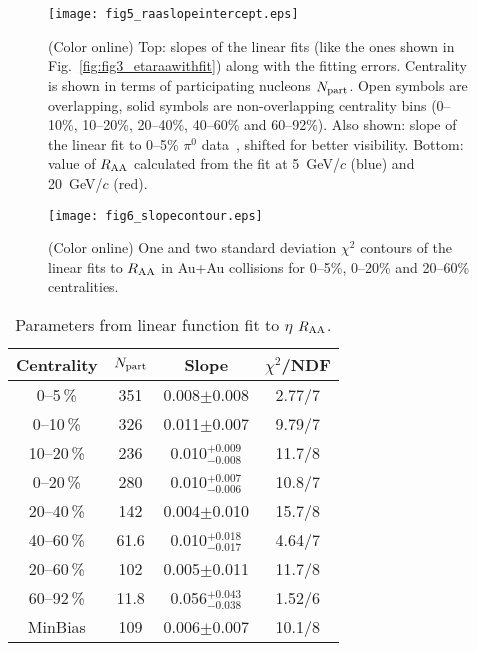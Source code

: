 \documentclass[aps,prc,superscriptaddress,showpacs,nofootinbib,floatfix,twocolumn]{revtex4}
\def\gevcs{~GeV/$c$ }
\def\raas{$R_{\rm AA}$ }
\def\pizs{$\pi^{0}$ }
\begin{document}
\begin{figure}[tbh]
\texttt{[image: fig5\_raaslopeintercept.eps]}
\caption{\label{fig:fig5_raaslopeintercept} (Color online) 
Top: slopes of the linear fits 
(like the ones shown in Fig.~\ref{fig:fig3_etaraawithfit}) along
with the fitting errors.  Centrality is shown in terms of
participating nucleons $N_{\rm part}$.  Open symbols are overlapping,
solid symbols are non-overlapping centrality bins 
(0--10\%, 10--20\%, 20--40\%, 40--60\% and 60--92\%).
Also shown: slope of the linear fit to 0--5\% \pizs 
data~\cite{ppg079},
shifted for better visibility.
Bottom: value of \raas calculated from the fit at 5\gevcs (blue) 
and 20\gevcs (red).
}
\end{figure}

\begin{figure}[bh]
\texttt{[image: fig6\_slopecontour.eps]}
\caption{\label{fig:fig6_slopecontour} (Color online) 
One and two standard deviation $\chi^2$ contours 
of the linear fits to \raas in Au+Au collisions 
for 0--5\%, 0--20\% and 20--60\% centralities.  }
\end{figure}


\begin{table}[htb]
\caption{Parameters from linear function fit to $\eta$ $R_{\rm AA}$.}
\label{table:raafitparams}
\begin{ruledtabular}
\begin{tabular}{cccc}
Centrality & $N_{\rm part}$ & Slope & $\chi^2$/NDF \\
\hline\hline
0--5\,\% & 351 & 0.008$\pm$0.008 & 2.77/7 \\
0--10\,\% & 326 &  0.011$\pm$0.007 & 9.79/7 \\
10--20\,\% & 236 &  0.010$^{+0.009}_{-0.008}$ & 11.7/8 \\
0--20\,\% & 280 &  0.010$^{+0.007}_{-0.006}$ & 10.8/7 \\
20--40\,\% & 142 &  0.004$\pm$0.010 & 15.7/8 \\
40--60\,\% & 61.6 &  0.010$^{+0.018}_{-0.017}$ & 4.64/7 \\
20--60\,\% & 102 &  0.005$\pm$0.011 & 11.7/8 \\
60--92\,\% & 11.8 &  0.056$^{+0.043}_{-0.038}$ & 1.52/6 \\
MinBias & 109 &  0.006$\pm$0.007 & 10.1/8 \\
\end{tabular}
\end{ruledtabular}
\end{table}
\end{document}

